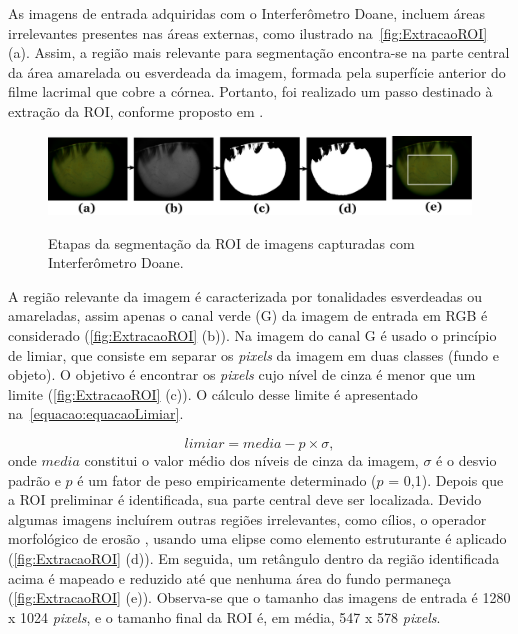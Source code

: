 As imagens de entrada adquiridas com o Interferômetro Doane, incluem áreas irrelevantes presentes nas áreas externas, como ilustrado na~\autoref{fig:ExtracaoROI} (a). Assim, a região mais relevante para segmentação encontra-se na parte central da área amarelada ou esverdeada da imagem, formada pela superfície anterior do filme lacrimal que cobre a córnea. Portanto, foi realizado um passo destinado à extração da ROI, conforme proposto em \cite{remeseiro2015automatic}.

\begin{figure}[ht!]
    \centering
    \caption{Etapas da segmentação da ROI de imagens capturadas com Interferômetro Doane.}
    \includegraphics[width=15.8cm]{figs/ExtracaoROI.png}
    \label{fig:ExtracaoROI}
\end{figure}

A região relevante da imagem é caracterizada por tonalidades esverdeadas ou amareladas, assim apenas o canal verde (G) da imagem de entrada em RGB é considerado (\autoref{fig:ExtracaoROI} (b)). Na imagem do canal G é usado o princípio de limiar, que consiste em separar os \textit{pixels} da imagem em duas classes (fundo e objeto). O objetivo é encontrar os \textit{pixels} cujo nível de cinza é menor que um limite (\autoref{fig:ExtracaoROI} (c)). O cálculo desse limite é apresentado na~\autoref{equacao:equacaoLimiar}.

\begin{equation}
\label{equacao:equacaoLimiar}
limiar = media - p  \times \sigma,
\end{equation}onde $media$ constitui o valor médio dos níveis de cinza da imagem, $\sigma$ é o desvio padrão e $p$ é um fator de peso empiricamente determinado ($p$ = 0,1). Depois que a ROI preliminar é identificada, sua parte central deve ser localizada. Devido algumas imagens incluírem outras regiões irrelevantes, como cílios, o operador morfológico de erosão \cite{gonzalez2008digital}, usando uma elipse como elemento estruturante é aplicado (\autoref{fig:ExtracaoROI} (d)). Em seguida, um retângulo dentro da região identificada acima é mapeado e reduzido até que nenhuma área do fundo permaneça (\autoref{fig:ExtracaoROI} (e)). Observa-se que o tamanho das imagens de entrada é 1280 x 1024 \textit{pixels}, e o tamanho final da ROI é, em média, 547 x 578 \textit{pixels}.

